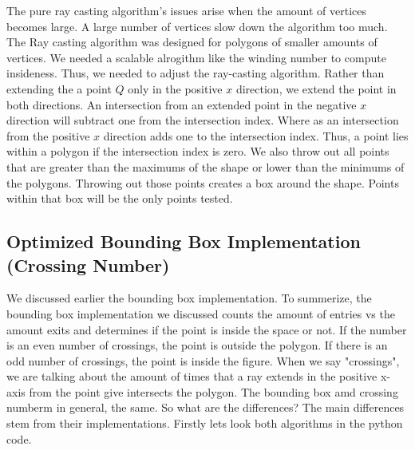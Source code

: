 \documentclass{article}
\begin{document}
The pure ray casting algorithm's issues arise when the amount of vertices becomes large.
A large number of vertices slow down the algorithm too much.
The Ray casting algorithm was designed for polygons of smaller amounts of vertices.
We needed a scalable alrogithm like the winding number to compute insideness.
Thus, we needed to adjust the ray-casting algorithm.
Rather than extending the a point $Q$ only in the positive $x$ direction, we extend the point in both directions.
An intersection from an extended point in the negative $x$ direction will subtract one from the intersection index.
Where as an intersection from the positive $x$ direction adds one to the intersection index.
Thus, a point lies within a polygon if the intersection index is zero.
We also throw out all points that are greater than the maximums of the shape or lower than the minimums of the polygons.
Throwing out those points creates a box around the shape.
Points within that box will be the only points tested.


\subsection{Optimized Bounding Box Implementation (Crossing Number)}
We discussed earlier the bounding box implementation.
To summerize, the bounding box implementation we discussed counts the amount of entries vs the amount exits and determines if the point is inside the space or not.
If the number is an even number of crossings, the point is outside the polygon.
If there is an odd number of crossings, the point is inside the figure.
When we say "crossings", we are talking about the amount of times that a ray extends in the positive x-axis from the point give intersects the polygon.
The bounding box amd crossing numberm in general, the same.
So what are the differences?
The main differences stem from their implementations.
Firstly lets look both algorithms in the python code.
\end{document}
